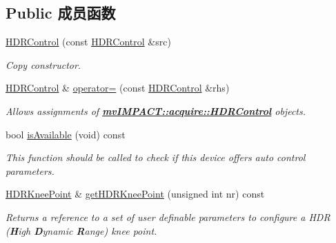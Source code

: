 \subsection*{Public 成员函数}
\begin{DoxyCompactItemize}
\item 
\hyperlink{classmv_i_m_p_a_c_t_1_1acquire_1_1_h_d_r_control_a40cde46ca5e317eefdbf83f350e123b3}{H\+D\+R\+Control} (const \hyperlink{classmv_i_m_p_a_c_t_1_1acquire_1_1_h_d_r_control}{H\+D\+R\+Control} \&src)
\begin{DoxyCompactList}\small\item\em Copy constructor. \end{DoxyCompactList}\item 
\hypertarget{classmv_i_m_p_a_c_t_1_1acquire_1_1_h_d_r_control_ad886104396a71e055993ada0b6a6040f}{\hyperlink{classmv_i_m_p_a_c_t_1_1acquire_1_1_h_d_r_control}{H\+D\+R\+Control} \& \hyperlink{classmv_i_m_p_a_c_t_1_1acquire_1_1_h_d_r_control_ad886104396a71e055993ada0b6a6040f}{operator=} (const \hyperlink{classmv_i_m_p_a_c_t_1_1acquire_1_1_h_d_r_control}{H\+D\+R\+Control} \&rhs)}\label{classmv_i_m_p_a_c_t_1_1acquire_1_1_h_d_r_control_ad886104396a71e055993ada0b6a6040f}

\begin{DoxyCompactList}\small\item\em Allows assignments of {\bfseries \hyperlink{classmv_i_m_p_a_c_t_1_1acquire_1_1_h_d_r_control}{mv\+I\+M\+P\+A\+C\+T\+::acquire\+::\+H\+D\+R\+Control}} objects. \end{DoxyCompactList}\item 
bool \hyperlink{classmv_i_m_p_a_c_t_1_1acquire_1_1_h_d_r_control_add08ec4170f8e6da3e75ce6939622c55}{is\+Available} (void) const 
\begin{DoxyCompactList}\small\item\em This function should be called to check if this device offers auto control parameters. \end{DoxyCompactList}\item 
\hyperlink{classmv_i_m_p_a_c_t_1_1acquire_1_1_h_d_r_knee_point}{H\+D\+R\+Knee\+Point} \& \hyperlink{classmv_i_m_p_a_c_t_1_1acquire_1_1_h_d_r_control_a1755ed0823de60ea0921efd4c2733b74}{get\+H\+D\+R\+Knee\+Point} (unsigned int nr) const 
\begin{DoxyCompactList}\small\item\em Returns a reference to a set of user definable parameters to configure a H\+D\+R ({\bfseries H}igh {\bfseries D}ynamic {\bfseries R}ange) knee point. \end{DoxyCompactList}\end{DoxyCompactItemize}

